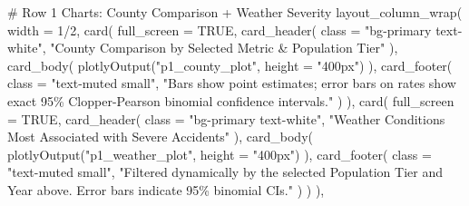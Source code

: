 \documentclass[
  letterpaper,
  DIV=11,
  numbers=noendperiod]{scrartcl}
\newenvironment{Shaded}{\begin{snugshade}}{\end{snugshade}}
\newcommand{\AttributeTok}[1]{\textcolor[rgb]{0.40,0.45,0.13}{#1}}
\newcommand{\CommentTok}[1]{\textcolor[rgb]{0.37,0.37,0.37}{#1}}
\newcommand{\ConstantTok}[1]{\textcolor[rgb]{0.56,0.35,0.01}{#1}}
\newcommand{\DecValTok}[1]{\textcolor[rgb]{0.68,0.00,0.00}{#1}}
\newcommand{\FunctionTok}[1]{\textcolor[rgb]{0.28,0.35,0.67}{#1}}
\newcommand{\NormalTok}[1]{\textcolor[rgb]{0.00,0.23,0.31}{#1}}
\newcommand{\SpecialCharTok}[1]{\textcolor[rgb]{0.37,0.37,0.37}{#1}}
\newcommand{\StringTok}[1]{\textcolor[rgb]{0.13,0.47,0.30}{#1}}
\begin{document}
\begin{Shaded}
\begin{Highlighting}[]
      \CommentTok{\# Row 1 Charts: County Comparison + Weather Severity}
      \FunctionTok{layout\_column\_wrap}\NormalTok{(}
        \AttributeTok{width =} \DecValTok{1}\SpecialCharTok{/}\DecValTok{2}\NormalTok{,}
        \FunctionTok{card}\NormalTok{(}
          \AttributeTok{full\_screen =} \ConstantTok{TRUE}\NormalTok{,}
          \FunctionTok{card\_header}\NormalTok{(}
            \AttributeTok{class =} \StringTok{"bg{-}primary text{-}white"}\NormalTok{,}
            \StringTok{"County Comparison by Selected Metric \& Population Tier"}
\NormalTok{          ),}
          \FunctionTok{card\_body}\NormalTok{(}
            \FunctionTok{plotlyOutput}\NormalTok{(}\StringTok{"p1\_county\_plot"}\NormalTok{, }\AttributeTok{height =} \StringTok{"400px"}\NormalTok{)}
\NormalTok{          ),}
          \FunctionTok{card\_footer}\NormalTok{(}
            \AttributeTok{class =} \StringTok{"text{-}muted small"}\NormalTok{,}
            \StringTok{"Bars show point estimates; error bars on rates show exact 95\% Clopper{-}Pearson binomial confidence intervals."}
\NormalTok{          )}
\NormalTok{        ),}
        \FunctionTok{card}\NormalTok{(}
          \AttributeTok{full\_screen =} \ConstantTok{TRUE}\NormalTok{,}
          \FunctionTok{card\_header}\NormalTok{(}
            \AttributeTok{class =} \StringTok{"bg{-}primary text{-}white"}\NormalTok{,}
            \StringTok{"Weather Conditions Most Associated with Severe Accidents"}
\NormalTok{          ),}
          \FunctionTok{card\_body}\NormalTok{(}
            \FunctionTok{plotlyOutput}\NormalTok{(}\StringTok{"p1\_weather\_plot"}\NormalTok{, }\AttributeTok{height =} \StringTok{"400px"}\NormalTok{)}
\NormalTok{          ),}
          \FunctionTok{card\_footer}\NormalTok{(}
            \AttributeTok{class =} \StringTok{"text{-}muted small"}\NormalTok{,}
            \StringTok{"Filtered dynamically by the selected Population Tier and Year above. Error bars indicate 95\% binomial CIs."}
\NormalTok{          )}
\NormalTok{        )}
\NormalTok{      ),}


\end{Highlighting}
\end{Shaded}
\end{document}

